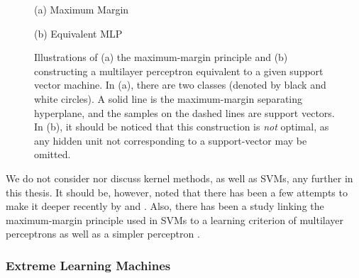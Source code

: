 \documentclass[dissertation,nocontribution]{aaltoseries}
\begin{document}
\begin{figure}[t]
    \vspace{2mm}
    \begin{minipage}{0.48\textwidth}
        \centering
        \small
        (a) Maximum Margin
    \end{minipage}
    \begin{minipage}{0.48\textwidth}
        \centering
        \small
        (b) Equivalent MLP
    \end{minipage}
    \caption{Illustrations of (a) the maximum-margin
    principle and (b) constructing a multilayer
    perceptron equivalent to a given support vector machine.
    In (a), there are two classes (denoted by black and
    white circles). A solid line is the maximum-margin
    separating hyperplane, and the samples on the dashed
    lines are support vectors. In (b), it should be noticed
    that this construction is \textit{not} optimal, as any
    hidden unit not corresponding to a support-vector may be
    omitted.}
    \label{fig:svm}
\end{figure}



We do not consider nor discuss kernel methods, as
well as SVMs, any further in this thesis.  It should be,
however, noted that there has been a few attempts to make it
deeper recently by \citet{Cho2009} and \citet{Damianou2012}.
Also, there has been a study linking the maximum-margin
principle used in SVMs to a learning criterion of
multilayer perceptrons as well as a simpler perceptron
\citep[see, e.g.,][]{Collobert2004}.

\subsubsection{Extreme Learning Machines}
\label{sec:elm}
\end{document}
